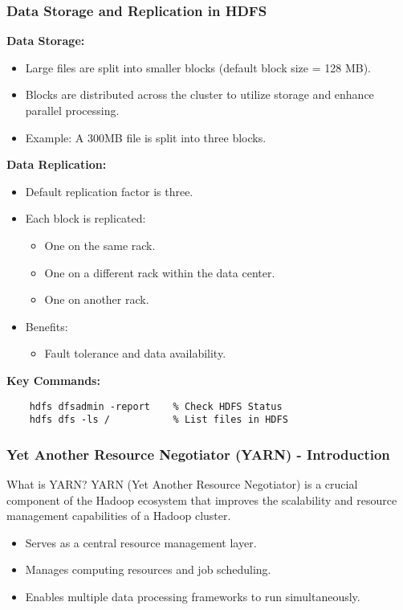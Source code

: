 \documentclass[aspectratio=169]{beamer}
\begin{document}
\begin{frame}[fragile]
    \frametitle{Data Storage and Replication in HDFS}
    \textbf{Data Storage:}
    \begin{itemize}
        \item Large files are split into smaller blocks (default block size = 128 MB).
        \item Blocks are distributed across the cluster to utilize storage and enhance parallel processing.
        \item Example: A 300MB file is split into three blocks.
    \end{itemize}

    \textbf{Data Replication:}
    \begin{itemize}
        \item Default replication factor is three.
        \item Each block is replicated:
            \begin{itemize}
                \item One on the same rack.
                \item One on a different rack within the data center.
                \item One on another rack.
            \end{itemize}
        \item Benefits:
            \begin{itemize}
                \item Fault tolerance and data availability.
            \end{itemize}
    \end{itemize}

    \textbf{Key Commands:}
    \begin{lstlisting}
    hdfs dfsadmin -report    % Check HDFS Status
    hdfs dfs -ls /           % List files in HDFS
    \end{lstlisting}
\end{frame}

\begin{frame}[fragile]
    \frametitle{Yet Another Resource Negotiator (YARN) - Introduction}
    \begin{block}{What is YARN?}
        YARN (Yet Another Resource Negotiator) is a crucial component of the Hadoop ecosystem that improves the scalability and resource management capabilities of a Hadoop cluster.
    \end{block}
    \begin{itemize}
        \item Serves as a central resource management layer.
        \item Manages computing resources and job scheduling.
        \item Enables multiple data processing frameworks to run simultaneously.
    \end{itemize}
\end{frame}
\end{document}
